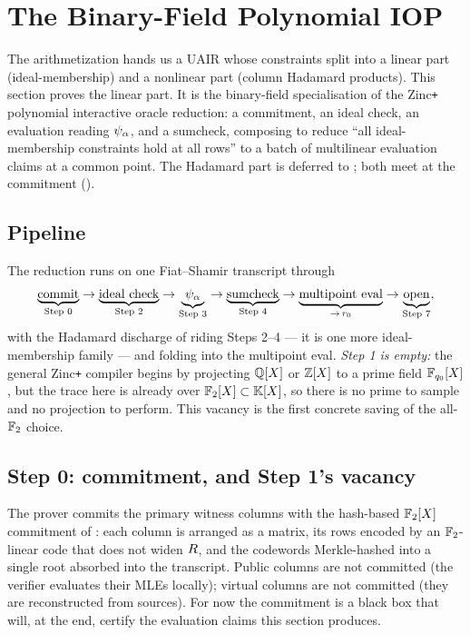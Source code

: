 \section{The Binary-Field Polynomial IOP}
\label{sec:piop}

The arithmetization hands us a UAIR whose constraints split into a linear part
(ideal-membership) and a nonlinear part (column Hadamard products). This section
proves the linear part. It is the binary-field specialisation of the
Zinc\texttt{+} polynomial interactive oracle reduction: a commitment, an ideal
check, an evaluation reading $\psi_{\alpha}$, and a sumcheck, composing to reduce ``all
ideal-membership constraints hold at all rows'' to a batch of multilinear
evaluation claims at a common point. The Hadamard part is deferred to
; both meet at the commitment ().

\subsection{Pipeline}
\label{sec:pipeline}

The reduction runs on one Fiat--Shamir transcript through
\[
  \underbrace{\text{commit}}_{\text{Step 0}}
  \to
  \underbrace{\text{ideal check}}_{\text{Step 2}}
  \to
  \underbrace{\psi_{\alpha}}_{\text{Step 3}}
  \to
  \underbrace{\text{sumcheck}}_{\text{Step 4}}
  \to
  \underbrace{\text{multipoint eval}}_{\to\, r_0}
  \to
  \underbrace{\text{open}}_{\text{Step 7}},
\]
with the Hadamard discharge of  riding Steps 2--4 --- it is
one more ideal-membership family --- and folding into the multipoint eval.
\emph{Step 1 is empty:} the general Zinc\texttt{+} compiler begins by projecting
$\mathbb{Q}[X]$ or $\mathbb{Z}[X]$ to a prime field $\mathbb{F}_{q_0}[X]$, but the trace here is already
over $\mathbb{F}_2[X]\subset\mathbb{K}[X]$, so there is no prime to sample and no projection to
perform. This vacancy is the first concrete saving of the all-$\mathbb{F}_2$ choice.

\subsection{Step 0: commitment, and Step 1's vacancy}
\label{sec:commit-step}

The prover commits the primary witness columns with the hash-based $\mathbb{F}_2[X]$
commitment of : each column is arranged as a matrix, its
rows encoded by an $\mathbb{F}_2$-linear code that does not widen $R$, and the
codewords Merkle-hashed into a single root absorbed into the transcript. Public
columns are not committed (the verifier evaluates their MLEs locally); virtual
columns are not committed (they are reconstructed from sources). For now the
commitment is a black box that will, at the end, certify the evaluation claims
this section produces.

